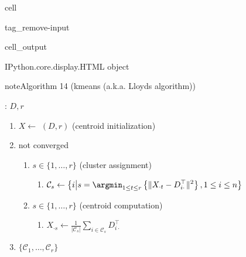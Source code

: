 \documentclass[letterpaper,10pt,english]{jupyterBook}
\begin{document}
\begin{sphinxuseclass}{cell}
\begin{sphinxuseclass}{tag_remove-input}\begin{sphinxVerbatimOutput}

\begin{sphinxuseclass}{cell_output}
\begin{sphinxVerbatim}[commandchars=\\\{\}]
\PYGZlt{}IPython.core.display.HTML object\PYGZgt{}
\end{sphinxVerbatim}

\end{sphinxuseclass}\end{sphinxVerbatimOutput}

\end{sphinxuseclass}
\end{sphinxuseclass}\label{clustering_k_means:algorithm-1}
\begin{sphinxadmonition}{note}{Algorithm 14 (k\sphinxhyphen{}means (a.k.a. Lloyds algorithm))}



\sphinxAtStartPar
{}: \(D, r\)
\begin{enumerate}
%
\item {} 
\sphinxAtStartPar
\(X\gets\) \((D, r)\) (centroid initialization)

\item {} 
\sphinxAtStartPar
{} not converged
\begin{enumerate}
%
\item {} 
\sphinxAtStartPar
{} \(s\in\{1,\ldots,r\}\) (cluster assignment)
\begin{enumerate}
%
\item {} 
\sphinxAtStartPar
\(\displaystyle\mathcal{C}_{s} \gets \left\{i\middle\vert s =\argmin_{1\leq t\leq r}\left\{\|X_{\cdot t}-D_{i\cdot}^\top\|^2\right\},1\leq i\leq n\right\}\)

\end{enumerate}

\item {} 
\sphinxAtStartPar
{} \(s\in\{1,\ldots,r\}\) (centroid computation)
\begin{enumerate}
%
\item {} 
\sphinxAtStartPar
\(\displaystyle X_{\cdot s}\gets \frac{1}{|\mathcal{C}_s|}\sum_{i\in\mathcal{C}_s}D_{i\cdot}^\top\)

\end{enumerate}

\end{enumerate}

\item {} 
\sphinxAtStartPar
{} \(\{\mathcal{C}_1,\ldots,\mathcal{C}_r\}\)

\end{enumerate}
\end{sphinxadmonition}
\end{document}
